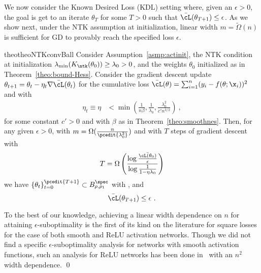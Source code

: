 We now consider the Known Desired Loss (KDL) setting where, given an $\epsilon>0$, the goal is get to an iterate $\theta_T$ for some $T>0$ such that $\bar{\cL}(\theta_{T+1}) \leq \epsilon$. As we show next, under the NTK assumption at initialization, linear width $m = \widetilde{\Omega}(n)$ is sufficient for GD to provably reach the specified loss $\epsilon$.

\begin{restatable}{theo}{theoNTKconvBall}
\label{thm:conv-NTK-ball} 
Consider Assumption~\ref{asmp:actinit}, the NTK condition at initialization $\lambda_{\min}(K_{\ntk}(\theta_0))\geq \lambda_0>0$, and the weights $\theta_0$ initialized as in Theorem~\ref{theo:bound-Hess}. Consider the gradient descent update $\theta_{t+1} = \theta_t - \eta_t \nabla \bar{\cL}(\theta_t)$ for the cumulative loss $\bar{\cL}(\theta) = \sum_{i=1}^n (y_i - f(\theta;\x_i))^2$ and with 
\begin{align*}
\eta_t \equiv \eta &< \min\left( \frac{1}{n\beta} , \frac{1}{\lambda_0} , \frac{\lambda_0^2}{c' n^{3/2}} \right) ~,
\end{align*}
for some constant $c'>0$ and with $\beta$ as in Theorem~\ref{theo:smoothnes}. 
Then, for any given $\epsilon > 0$, with $m = \Omega(\frac{n}{\pcedit{\lambda_0^2}})$
and with $T$ steps of gradient descent with
\begin{align}
T = \Omega\left( \frac{\log \frac{\bar{\cL(\theta_0)}}{\epsilon}}{\log \frac{1}{1-\eta \lambda_0}} \right)
\end{align}
 we have
$\{\theta_t\}_{t=0}^{\pcedit{T+1}} \subset B^{\spec}_{\rho,\rho_1}$ with , and
\begin{equation}
    \bar{\cL}(\theta_{T+1}) \leq \epsilon~.
    \label{eq:conv-NTK}
\end{equation}
\label{prop:conv-NTK}
\end{restatable}


\begin{remark} To the best of our knowledge, achieving a linear width dependence on $n$ for attaining $\epsilon$-suboptimality is the first of its kind on the literature for square losses for the case of both smooth and ReLU activation networks. Though we did not find a specific $\epsilon$-suboptimality analysis for networks with smooth activation functions, such an analysis for ReLU networks has been done in~\citep{AM-SO-ZS-DPW:22} with an $n^2$ width dependence. \qed 
\end{remark}

